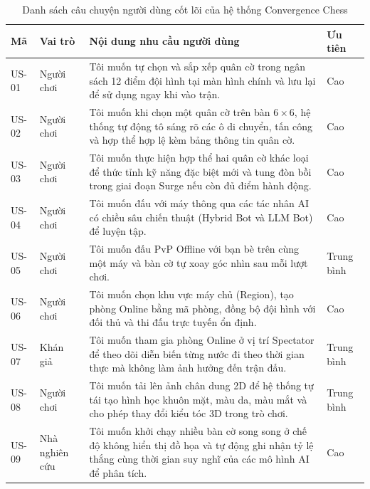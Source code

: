\begin{table}[H]
    \centering
    \caption{Danh sách câu chuyện người dùng cốt lõi của hệ thống Convergence Chess}
    \label{tab:user_stories}
    \begin{tabularx}{\textwidth}{|C{1.3cm}|L{2.4cm}|Y|C{2.0cm}|}
        \hline
        \textbf{Mã} & \textbf{Vai trò} & \textbf{Nội dung nhu cầu người dùng} & \textbf{Ưu tiên} \\
        \hline
        US-01 & Người chơi & Tôi muốn tự chọn và sắp xếp quân cờ trong ngân sách 12 điểm đội hình tại màn hình chính và lưu lại để sử dụng ngay khi vào trận. & Cao \\
        \hline
        US-02 & Người chơi & Tôi muốn khi chọn một quân cờ trên bàn $6 \times 6$, hệ thống tự động tô sáng rõ các ô di chuyển, tấn công và hợp thể hợp lệ kèm bảng thông tin quân cờ. & Cao \\
        \hline
        US-03 & Người chơi & Tôi muốn thực hiện hợp thể hai quân cờ khác loại để thức tỉnh kỹ năng đặc biệt mới và tung đòn bồi trong giai đoạn Surge nếu còn đủ điểm hành động. & Cao \\
        \hline
        US-04 & Người chơi & Tôi muốn đấu với máy thông qua các tác nhân AI có chiều sâu chiến thuật (Hybrid Bot và LLM Bot) để luyện tập. & Cao \\
        \hline
        US-05 & Người chơi & Tôi muốn đấu PvP Offline với bạn bè trên cùng một máy và bàn cờ tự xoay góc nhìn sau mỗi lượt chơi. & Trung bình \\
        \hline
        US-06 & Người chơi & Tôi muốn chọn khu vực máy chủ (Region), tạo phòng Online bằng mã phòng, đồng bộ đội hình với đối thủ và thi đấu trực tuyến ổn định. & Cao \\
        \hline
        US-07 & Khán giả & Tôi muốn tham gia phòng Online ở vị trí Spectator để theo dõi diễn biến từng nước đi theo thời gian thực mà không làm ảnh hưởng đến trận đấu. & Trung bình \\
        \hline
        US-08 & Người chơi & Tôi muốn tải lên ảnh chân dung 2D để hệ thống tự tái tạo hình học khuôn mặt, màu da, màu mắt và cho phép thay đổi kiểu tóc 3D trong trò chơi. & Trung bình \\
        \hline
        US-09 & Nhà nghiên cứu & Tôi muốn khởi chạy nhiều bàn cờ song song ở chế độ không hiển thị đồ họa và tự động ghi nhận tỷ lệ thắng cùng thời gian suy nghĩ của các mô hình AI để phân tích. & Cao \\
        \hline
    \end{tabularx}
\end{table}

